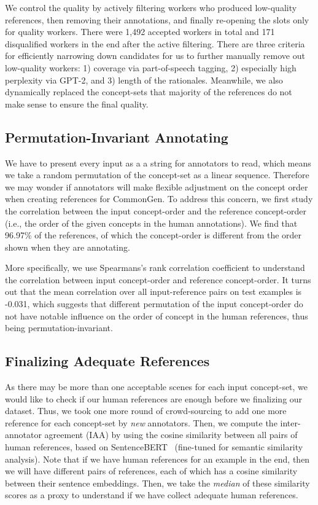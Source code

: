 \documentclass[11pt,a4paper]{article}
\begin{document}
    We control the quality by actively filtering workers who produced low-quality references, then removing their annotations, and finally re-opening the slots only for quality workers. {There were 1,492 accepted workers in total and 171 disqualified workers in the end after the active filtering.}
    There are three criteria for efficiently narrowing down candidates for us to further manually remove out low-quality workers: 1) coverage via part-of-speech tagging, 2) especially high perplexity via GPT-2, and 3) length of the rationales.
    Meanwhile, we also dynamically replaced the concept-sets that majority of the references do not make sense to ensure the final quality.
    
    \subsection{Permutation-Invariant Annotating}
    We have to present every input as a a string for annotators to read, which means we take a random permutation of the concept-set as a linear sequence. Therefore we may wonder if annotators will make flexible adjustment on the concept order when creating references for CommonGen.
	To address this concern, 
	we first study the correlation between the input concept-order and the reference concept-order (i.e., the order of the given concepts in the human annotations).
	We find that 96.97\% of the references, of which the concept-order is different from the order shown when they are annotating.
	
    More specifically, 
    we use Spearmans's rank correlation coefficient to understand the correlation between input concept-order and reference concept-order.
    It turns out that the mean correlation over all input-reference pairs on test examples is -0.031, which suggests that different permutation of the input concept-order do not have notable influence on the order of concept in the human references, thus being permutation-invariant.
	
	\subsection{Finalizing Adequate References}
	As there may be more than one acceptable scenes for each input concept-set, we would like to check if our human references are enough before we finalizing our dataset.
	Thus, we took one more round of crowd-sourcing to add one more reference for each concept-set by \textit{new} annotators.
	Then, we compute the inter-annotator agreement (IAA) by using the cosine similarity between all pairs of human references, based on SentenceBERT~\cite{reimers-gurevych-2019-sentence} (fine-tuned for semantic similarity analysis).
	Note that if we have  human references for an example in the end, then we will have  different pairs of references, each of which has a cosine similarity between their sentence embeddings.
	Then, we take the \textit{median} of these similarity scores as a proxy to understand if we have collect adequate human references.
	
\end{document}
